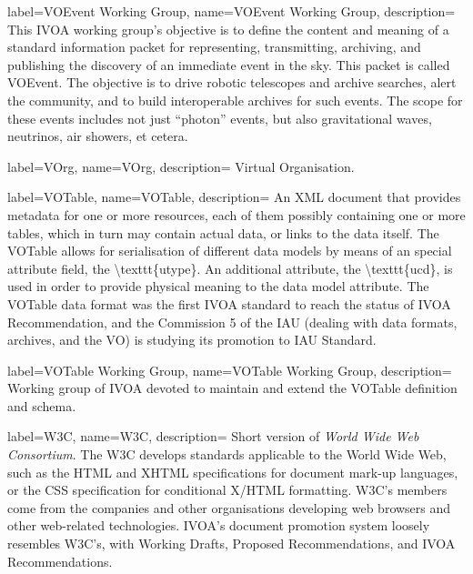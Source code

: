 {
    label={VOEvent Working Group},
    name={VOEvent Working Group},
    description={
    	This \gls{IVOA} working group's objective is to define the
        content and meaning of a standard information packet for
        representing, transmitting, archiving, and publishing the
        discovery of an immediate event in the sky. This packet is
        called VOEvent. The objective is to drive robotic telescopes
        and archive searches, alert the community, and to build
        interoperable archives for such events. The scope for these
        events includes not just ``photon'' events, but also
        gravitational waves, neutrinos, air showers, et cetera.
    }
}

{
    label={VOrg},
    name={VOrg},
    description={
    	\gls{Virtual Organisation}.
    }
}

{
    label={VOTable},
    name={VOTable},
    description={
    	An \gls{XML} document that provides \gls{metadata} for one or
        more resources, each of them possibly containing one or more
        tables, which in turn may contain actual data, or links to the
        data itself. The VOTable allows for serialisation of different
        data models by means of an special attribute field, the
        \gls{\texttt{utype}}. An additional attribute, the
        \gls{\texttt{ucd}}, is used in order to provide physical
        meaning to the data model attribute. The VOTable data format
        was the first \gls{IVOA} standard to reach the status of
        \gls{IVOA Recommendation}, and the Commission 5 of the
        \gls{IAU} (dealing with data formats, archives, and the VO) is
        studying its promotion to IAU Standard.
    }
}

{
    label={VOTable Working Group},
    name={VOTable Working Group},
    description={
    	Working group of \gls{IVOA} devoted to maintain and extend the
        \gls{VOTable} definition and schema.
    }
}

{
    label={W3C},
    name={W3C},
    description={
    	Short version of \emph{World Wide Web Consortium}. The W3C
        develops standards applicable to the \gls{World Wide Web}, such
        as the \gls{HTML} and \gls{XHTML} specifications for document
        mark-up languages, or the \gls{CSS} specification for
        conditional X/HTML formatting. W3C's members come from the
        companies and other organisations developing web browsers and
        other web-related technologies. \gls{IVOA}'s document promotion
        system loosely resembles W3C's, with Working Drafts, Proposed
        Recommendations, and IVOA Recommendations.
    }
}

